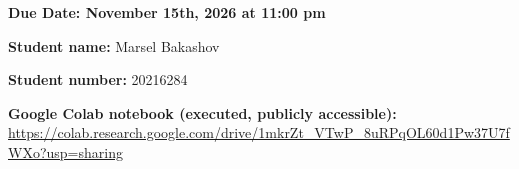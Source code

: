 \documentclass[12pt]{article}
\theoremstyle{definition}
\begin{document}
\fancyhead{}
\fancyfoot{}

\textbf{Due Date: November 15th, 2026 at 11:00 pm}

\textbf{Student name:} Marsel Bakashov\par
\textbf{Student number:} 20216284\par
\textbf{Google Colab notebook (executed, publicly accessible):} \url{https://colab.research.google.com/drive/1mkrZt_VTwP_8uRPqOL60d1Pw37U7fWXo?usp=sharing}\par

\end{document}
